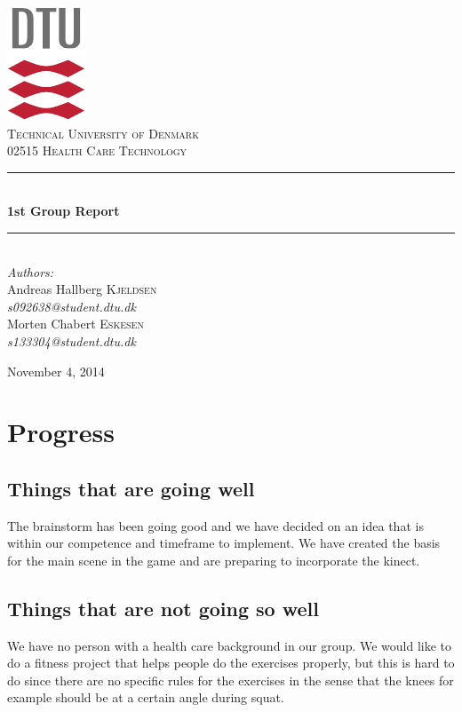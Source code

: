 \documentclass[12pt]{report}
\newcommand{\HRule}{\rule{\linewidth}{0.5mm}}
\begin{document}
\begin{titlepage}
\begin{center}

\includegraphics[scale=2.0]{../GFX/dtu_logo.pdf}\\[1cm]

\textsc{\LARGE Technical University of Denmark}\\[1.5cm]

\textsc{\Large 02515 Health Care Technology}\\[0.5cm]


\HRule \\[0.4cm]
{\huge \bfseries 1st Group Report}\\[0.1cm]
\HRule \\[1.5cm]

\large
\emph{Authors:}
\\[10pt]
Andreas Hallberg \textsc{Kjeldsen}\\
\emph{s092638@student.dtu.dk}
\\[10pt]
Morten Chabert \textsc{Eskesen}\\
\emph{s133304@student.dtu.dk}

\vfill

{\large November 4, 2014}

\end{center}
\end{titlepage}

\section*{Progress}
\subsection*{Things that are going well}
The brainstorm has been going good and we have decided on an idea that is within our competence and timeframe to implement. We have created the basis for the main scene in the game and are preparing to incorporate the kinect.

\subsection*{Things that are not going so well}
We have no person with a health care background in our group. We would like to do a fitness project that helps people do the exercises properly, but this is hard to do since there are no specific rules for the exercises in the sense that the knees for example should be at a certain angle during squat.
\end{document}
